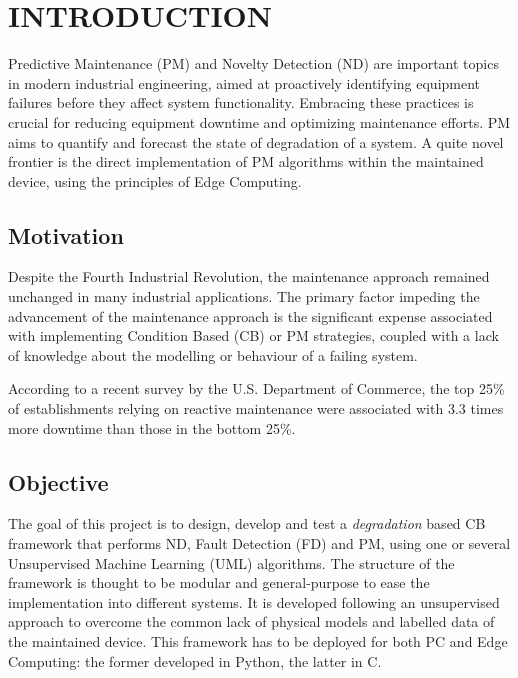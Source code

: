 \section{INTRODUCTION}
\label{sec:introduction}

Predictive Maintenance (PM) and Novelty Detection (ND) are important topics in modern industrial engineering, aimed at proactively identifying equipment failures before they affect system functionality. Embracing these practices is crucial for reducing equipment downtime and optimizing maintenance efforts. PM aims to quantify and forecast the state of degradation of a system. A quite novel frontier is the direct implementation of PM algorithms within the maintained device, using the principles of Edge Computing.

\subsection{Motivation}
Despite the Fourth Industrial Revolution, the maintenance approach remained unchanged in many industrial applications. The primary factor impeding the advancement of the maintenance approach is the significant expense associated with implementing Condition Based (CB) or PM strategies, coupled with a lack of knowledge about the modelling or behaviour of a failing system.

According to a recent survey by the U.S. Department of Commerce, the top 25\% of establishments relying on reactive maintenance
were associated with 3.3 times more downtime than those in the bottom 25\%. 

\subsection{Objective}
The goal of this project is to design, develop and test a \emph{degradation} based CB framework
that performs ND, Fault Detection (FD) and PM, using one or several Unsupervised Machine Learning (UML) algorithms. 
The structure of the framework is thought to be modular and general-purpose to ease the implementation into different systems. It is developed following an unsupervised approach to overcome the common lack of physical models and labelled data of the maintained device. This framework has to be deployed for both PC and Edge Computing: the former developed in Python, the latter in C.